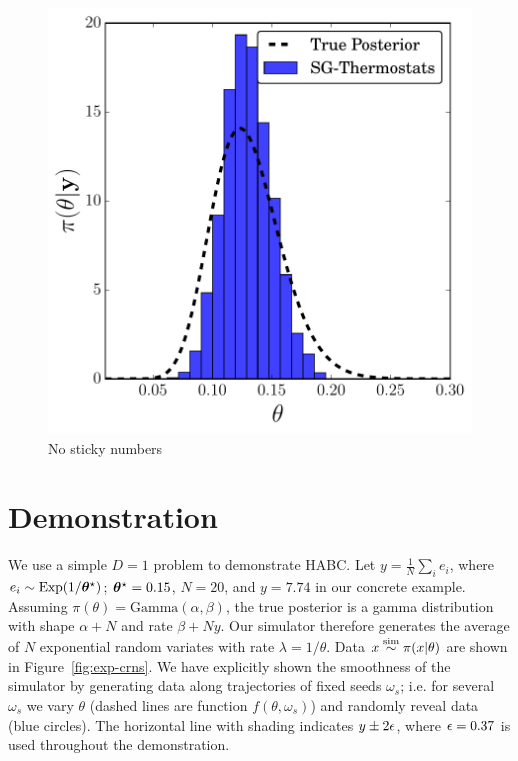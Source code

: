 \documentclass[]{article}
\begin{document}
\begin{figure}[t]
\begin{center}
\includegraphics[width=0.45\columnwidth]{./images/exp-SG-Thermostats-posterior-hist-omega-rate-100p0-chain0.pdf}
\caption{\small{No sticky numbers}}
\label{fig:exp-posteriors}
\end{center}
\vskip -0.2in
\end{figure} 

\section{Demonstration}\label{sec:demo}
We use a simple $D=1$ problem to demonstrate HABC.  Let $y= \frac{1}{N} \sum_{i} e_i$, where $e_i \sim \text{Exp}(1/{\bm \theta}^{\star})$; ${\bm \theta}^{\star} = 0.15$, $N=20$, and $y=7.74$ in our concrete example.  Assuming $\pi(\theta ) = \text{Gamma}(\alpha, \beta)$, the true posterior is a gamma distribution with shape $\alpha+N$ and rate $\beta + N y$.  Our simulator therefore generates the average of $N$ exponential random variates with rate $\lambda = 1/\theta$.  Data $x \overset{\operatorname{sim}}{\sim} \pi(x|\theta)$ are shown in Figure~\ref{fig:exp-crns}.  We have explicitly shown the smoothness of the simulator by generating data along trajectories of fixed seeds $\omega_s$; i.e. for several $\omega_s$ we vary $\theta$ (dashed lines are function $f(\theta, \omega_s)$) and randomly reveal data (blue circles).  The horizontal line with shading indicates $y \pm 2 \epsilon$, where $\epsilon = 0.37$ is used throughout the demonstration.
\end{document}
